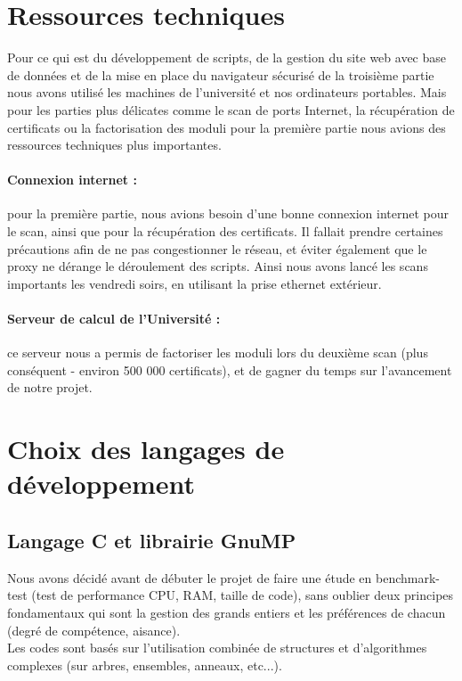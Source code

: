 \section{Ressources techniques}

Pour ce qui est du développement de scripts, de la gestion du site web avec base de données et de la mise en place du navigateur sécurisé de la troisième partie nous avons utilisé les machines de l'université et nos ordinateurs portables. Mais pour les parties plus délicates comme le scan de ports Internet, la récupération de certificats ou la factorisation des moduli pour la première partie nous avions des ressources techniques plus importantes.

\paragraph{Connexion internet : } pour la première partie, nous avions besoin d'une bonne connexion internet pour le scan, ainsi que pour la récupération des certificats. Il fallait prendre certaines précautions afin de ne pas congestionner le réseau, et éviter également que le proxy ne dérange le déroulement des scripts. Ainsi nous avons lancé les scans importants les vendredi soirs, en utilisant la prise ethernet extérieur.

\paragraph{Serveur de calcul de l'Université :} ce serveur nous a permis de factoriser les moduli lors du deuxième scan (plus conséquent - environ 500 000 certificats), et de gagner du temps sur l'avancement de notre projet.

\section{Choix des langages de développement}

\subsection{Langage C et librairie GnuMP}

Nous avons décidé avant de débuter le projet de faire une étude en benchmark-test \cite{chooseprogram2013} \cite{marceau2009program} \cite{udemypng} (test de performance CPU, RAM, taille de code), sans oublier deux principes fondamentaux qui sont la gestion des grands entiers et les préférences de chacun (degré de compétence, aisance).\\
Les codes sont basés sur l'utilisation combinée de structures et d'algorithmes complexes (sur arbres, ensembles, anneaux, etc...).\\

